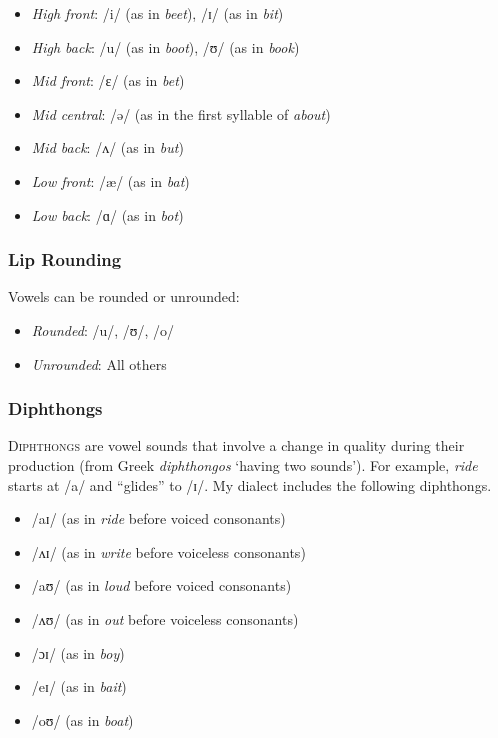 \begin{itemize}[noitemsep]
    \item \textit{High front}: /i/ (as in \textit{beet}), /ɪ/ (as in \textit{bit})
    \item \textit{High back}: /u/ (as in \textit{boot}), /ʊ/ (as in \textit{book})
    \item \textit{Mid front}: /ɛ/ (as in \textit{bet})
    \item \textit{Mid central}: /ə/ (as in the first syllable of \textit{about})
    \item \textit{Mid back}: /ʌ/ (as in \textit{but})
    \item \textit{Low front}: /æ/ (as in \textit{bat})
    \item \textit{Low back}: /ɑ/ (as in \textit{bot})
\end{itemize}

\subsubsection{Lip Rounding}

Vowels can be rounded or unrounded:

\begin{itemize}[noitemsep]
    \item \textit{Rounded}: /u/, /ʊ/, /o/
    \item \textit{Unrounded}: All others
\end{itemize}

\subsubsection{Diphthongs}

\textsc{Diphthongs} are vowel sounds that involve a change in quality during their production (from Greek \textit{diphthongos} `having two sounds'). For example, \textit{ride} starts at /a/ and ``glides'' to /ɪ/. My dialect includes the following diphthongs.

\begin{itemize}[noitemsep]
    \item /aɪ/ (as in \textit{ride} before voiced consonants)
    \item /ʌɪ/ (as in \textit{write} before voiceless consonants)
    \item /aʊ/ (as in \textit{loud} before voiced consonants)
    \item /ʌʊ/ (as in \textit{out} before voiceless consonants)
    \item /ɔɪ/ (as in \textit{boy})
    \item /eɪ/ (as in \textit{bait})
    \item /oʊ/ (as in \textit{boat})
\end{itemize}


